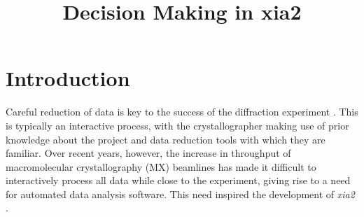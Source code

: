 \documentclass[a4paper, 11pt]{article}
\begin{document}
\title{Decision Making in xia2}



\maketitle
\clearpage






\section{Introduction}

Careful reduction of data is key to the success of the diffraction
experiment \cite{Dauter:ba0020}. This is typically an interactive
process, with the crystallographer making use of prior knowledge about
the project and data reduction tools with which they are
familiar. Over recent years, however, the increase in throughput of
macromolecular crystallography (MX) beamlines has made it difficult to
interactively process all data while close to the experiment, giving
rise to a need for automated data analysis software. This need
inspired the development of \emph{xia2} \cite{Winter:ea5113}. 
\end{document}
